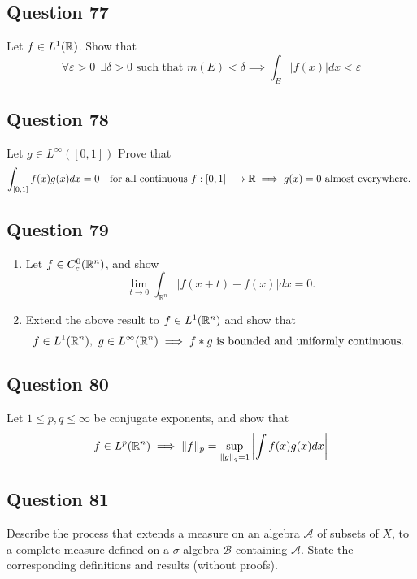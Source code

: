 \documentclass[12pt]{article}
\begin{document}
\hypertarget{question-77-1}{%
\subsection{Question 77}\label{question-77-1}}

Let \(f\in L^1({\mathbb{R}})\). Show that \[
\forall\varepsilon > 0 ~~\exists \delta > 0 \text{ such that } m(E) < \delta \implies \int_{E}|f(x)| d x<\varepsilon
\]

\hypertarget{question-78-1}{%
\subsection{Question 78}\label{question-78-1}}

Let \(g\in L^\infty([0, 1])\) Prove that \[
\int_{[0,1]} f(x) g(x) d x=0 \quad\text{for all continuous } f:[0, 1] \longrightarrow {\mathbb{R}} \implies g(x) = 0 \text{ almost everywhere. }
\]

\hypertarget{question-79-1}{%
\subsection{Question 79}\label{question-79-1}}

\begin{enumerate}
\def\labelenumi{\arabic{enumi}.}
\item
  Let \(f \in C_c^0({\mathbb{R}}^n)\), and show \[
  \lim _{t \rightarrow 0} \int_{\mathbb{R}^{n}}|f(x+t)-f(x)| d x=0.
  \]
\item
  Extend the above result to \(f\in L^1({\mathbb{R}}^n)\) and show that \[
  f\in L^1({\mathbb{R}}^n),~ g\in L^\infty({\mathbb{R}}^n) \implies f \ast g \text{ is bounded and uniformly continuous. }
  \]
\end{enumerate}

\hypertarget{question-80-1}{%
\subsection{Question 80}\label{question-80-1}}

Let \(1 \leq p,q \leq \infty\) be conjugate exponents, and show that \[
f \in L^p({\mathbb{R}}^n) \implies \|f\|_{p}=\sup _{\|g\|_{q}=1}\left|\int f(x) g(x) d x\right|
\]

\hypertarget{question-81-1}{%
\subsection{Question 81}\label{question-81-1}}

Describe the process that extends a measure on an algebra
\(\mathcal{A}\) of subsets of \(X\), to a complete measure defined on a
\(\sigma\)-algebra \(\mathcal{B}\) containing \(\mathcal{A}\). State the
corresponding definitions and results (without proofs).
\end{document}
